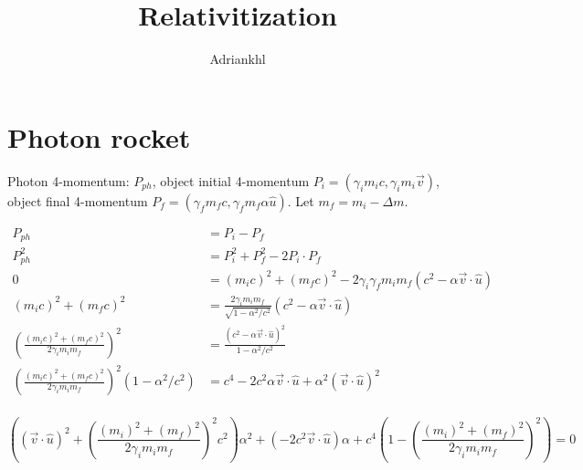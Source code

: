 \documentclass[12pt, letterpaper]{article}
\title{Relativitization}
\author{Adriankhl}
\begin{document}
\begin{titlepage}
\maketitle
\end{titlepage}

\section{Photon rocket}

Photon 4-momentum: $P_{ph}$, object initial 4-momentum $P_i = (\gamma_i m_i c, \gamma_i m_i \overrightarrow{v}) $,
object final 4-momentum $P_f = (\gamma_f m_f c, \gamma_f m_f \alpha \hat{u})$. Let $m_f = m_i - \Delta m$.

\begin{align*}
  P_{ph} &= P_i - P_f \\
  P_{ph}^2 &= P_i^2 + P_f^2 - 2 P_i \cdot P_f \\
  0 &= (m_i c)^2 + (m_f c)^2 - 2 \gamma_i \gamma_f m_i m_f ( c^2 - \alpha \overrightarrow{v} \cdot \hat{u}) \\
  (m_i c)^2 + (m_f c)^2 &= \frac{2 \gamma_i m_i m_f}{\sqrt{1 - \alpha^2 / c^2}} ( c^2 - \alpha \overrightarrow{v} \cdot \hat{u}) \\
  \left(\frac{(m_i c)^2 + (m_f c)^2}{2 \gamma_i m_i m_f}\right)^2 &= \frac{(c^2 - \alpha \overrightarrow{v} \cdot \hat{u})^2}{1 - \alpha^2 / c^2} \\
  \left(\frac{(m_i c)^2 + (m_f c)^2}{2 \gamma_i m_i m_f}\right)^2 (1 - \alpha^2 / c^2) &= c^4 - 2 c^2 \alpha \overrightarrow{v} \cdot \hat{u} + \alpha^2 (\overrightarrow{v} \cdot \hat{u})^2 \\
\end{align*}

\begin{equation*}
  ((\overrightarrow{v} \cdot \hat{u})^2 + \left(\frac{(m_i)^2 + (m_f)^2}{2 \gamma_i m_i m_f}\right)^2 c^2) \alpha ^2 + (- 2 c^2 \overrightarrow{v} \cdot \hat{u}) \alpha + c^4 \left(1 - \left(\frac{(m_i)^2 + (m_f)^2}{2 \gamma_i m_i m_f}\right)^2 \right) = 0
\end{equation*}
\end{document}
